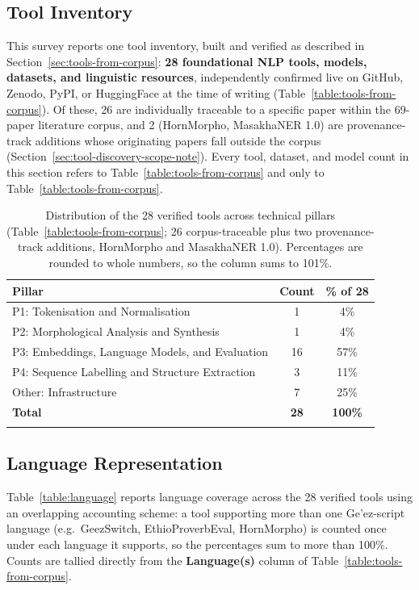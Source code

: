 \documentclass[sn-mathphys-num]{sn-jnl}
\theoremstyle{thmstyleone}
\theoremstyle{thmstyletwo}
\theoremstyle{thmstylethree}
\begin{document}
\subsection{Tool Inventory}\label{sec:tool-inventory}

This survey reports one tool inventory, built and verified as described in Section~\ref{sec:tools-from-corpus}: \textbf{28 foundational NLP tools, models, datasets, and linguistic resources}, independently confirmed live on GitHub, Zenodo, PyPI, or HuggingFace at the time of writing (Table~\ref{table:tools-from-corpus}). Of these, 26 are individually traceable to a specific paper within the 69-paper literature corpus, and 2 (HornMorpho, MasakhaNER 1.0) are provenance-track additions whose originating papers fall outside the corpus (Section~\ref{sec:tool-discovery-scope-note}). Every tool, dataset, and model count in this section refers to Table~\ref{table:tools-from-corpus} and only to Table~\ref{table:tools-from-corpus}.

\begin{table}[h]
\caption{Distribution of the 28 verified tools across technical pillars (Table~\ref{table:tools-from-corpus}; 26 corpus-traceable plus two provenance-track additions, HornMorpho and MasakhaNER 1.0). Percentages are rounded to whole numbers, so the column sums to 101\%.}\label{table:overview}
\begin{tabular}{@{}lcc@{}}
\toprule
\textbf{Pillar} & \textbf{Count} & \textbf{\% of 28} \\
\midrule
P1: Tokenisation and Normalisation & 1 & 4\% \\
P2: Morphological Analysis and Synthesis & 1 & 4\% \\
P3: Embeddings, Language Models, and Evaluation & 16 & 57\% \\
P4: Sequence Labelling and Structure Extraction & 3 & 11\% \\
Other: Infrastructure & 7 & 25\% \\
\midrule
\textbf{Total} & \textbf{28} & \textbf{100\%} \\
\botrule
\end{tabular}
\end{table}

\subsection{Language Representation}\label{sec:language-representation}

Table~\ref{table:language} reports language coverage across the 28 verified tools using an overlapping accounting scheme: a tool supporting more than one Ge'ez-script language (e.g.\ GeezSwitch, EthioProverbEval, HornMorpho) is counted once under each language it supports, so the percentages sum to more than 100\%. Counts are tallied directly from the \textbf{Language(s)} column of Table~\ref{table:tools-from-corpus}.
\end{document}
